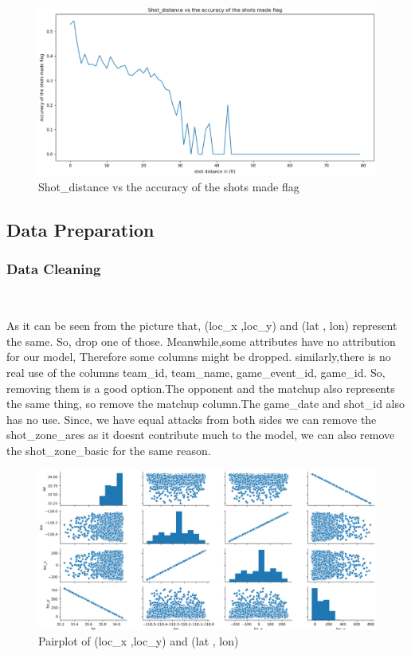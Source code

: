 \begin{figure}[H]
	\centering
	\includegraphics[scale=0.28]{s.eps
	}        %
	\caption{Shot_distance vs the accuracy of the shots made flag}
	\label{fig6}
\end{figure}
\newpage
\subsection{Data Preparation}

\subsubsection{Data Cleaning}
\

As it can be seen from 
the picture that, (loc_x ,loc_y) and (lat , lon) represent the same.
So, drop one of those.
Meanwhile,some attributes have no attribution for our model,
Therefore some columns might be dropped.
similarly,there is no real use of the columns team_id, team_name, game_event_id, game_id.
So, removing them is a good option.The opponent and the matchup also represents the same thing, 
so remove the matchup column.The game_date and shot_id also has no use.
Since, we have equal attacks from both sides we can remove the shot_zone_ares as it
doesnt contribute much to the model, we can also remove the shot_zone_basic for the same reason.


\begin{figure}[H]
	\centering
	\includegraphics[scale=0.25]{t.eps
	}        %
	\caption{Pairplot of (loc\_x ,loc\_y) and (lat , lon)}
	\label{fig7}
\end{figure}


